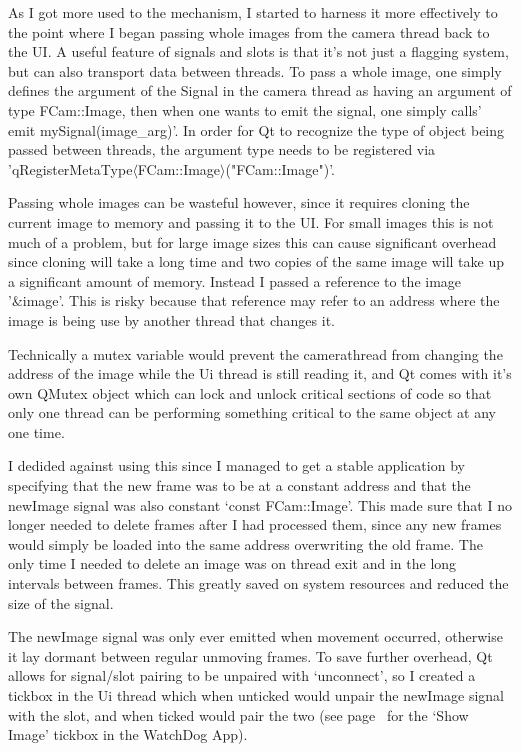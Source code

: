 \documentclass[11pt]{article} %
\begin{document}
{{As I got more used to the mechanism, I started to harness it more effectively to the point where I began passing whole images from the camera thread back to the UI. A useful feature of signals and slots is that it's not just a flagging system, but can also transport data between threads.  To pass a whole image, one simply defines the argument of the Signal in the camera thread as having an argument of type FCam::Image, then when one wants to emit the signal, one simply calls' emit mySignal(image\_arg)'. In order for Qt to recognize the type of object being passed between threads, the argument type needs to be registered via 'qRegisterMetaType\(\langle\)FCam::Image\(\rangle\)("FCam::Image")'.

Passing whole images can be wasteful however, since it requires cloning the current image to memory and passing it to the UI. For small images this is not much of a problem, but for large image sizes this can cause significant overhead since cloning will take a long time and two copies of the same image will take up a significant amount of memory. Instead I passed a reference to the image '\&image'. This is risky because that reference may refer to an address where the image is being use by another thread that changes it. 

Technically a mutex variable would prevent the camerathread from changing the address of the image while the Ui thread is still reading it, and Qt comes with it’s own QMutex object which can lock and unlock critical sections of code so that only one thread can be performing something critical to the same object at any one time.

I dedided against using this since I managed to get a stable application by specifying that the new frame was to be at a constant address and that the newImage signal was also constant ‘const FCam::Image’. This made sure that I no longer needed to delete frames after I had processed them, since any new frames would simply be loaded into the same address overwriting the old frame. The only time I needed to delete an image was on thread exit and in the long intervals between frames. This greatly saved on system resources and reduced the size of the signal.

The newImage signal was only ever emitted when movement occurred, otherwise it lay dormant between regular unmoving frames.
To save further overhead, Qt allows for signal/slot pairing to be unpaired with ‘unconnect’, so I created a tickbox in the Ui thread which when unticked would unpair the newImage signal with the slot, and when ticked would pair the two (see page~\pageref{guimap} for the ‘Show Image’ tickbox in the WatchDog App).

}}
\end{document}
